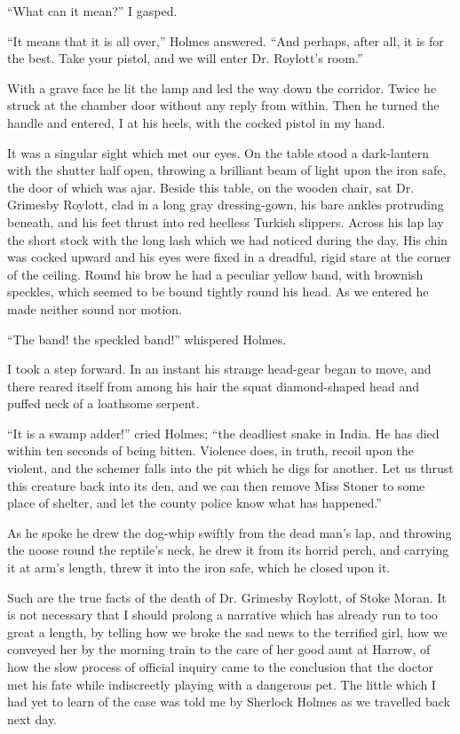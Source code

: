 “What can it mean?” I gasped.

“It means that it is all over,” Holmes answered. “And
perhaps, after all, it is for the best. Take your pistol, and we
will enter Dr. Roylott’s room.”

With a grave face he lit the lamp and led the way down
the corridor. Twice he struck at the chamber door without
any reply from within. Then he turned the handle and entered,
I at his heels, with the cocked pistol in my hand.

It was a singular sight which met our eyes. On the table
stood a dark-lantern with the shutter half open, throwing a
brilliant beam of light upon the iron safe, the door of which
was ajar. Beside this table, on the wooden chair, sat Dr.
Grimesby Roylott, clad in a long gray dressing-gown, his bare
ankles protruding beneath, and his feet thrust into red heelless
Turkish slippers. Across his lap lay the short stock with
the long lash which we had noticed during the day. His chin
was cocked upward and his eyes were fixed in a dreadful,
rigid stare at the corner of the ceiling. Round his brow he
had a peculiar yellow band, with brownish speckles, which
seemed to be bound tightly round his head. As we entered
he made neither sound nor motion.

“The band! the speckled band!” whispered Holmes.

I took a step forward. In an instant his strange head-gear
began to move, and there reared itself from among his hair
the squat diamond-shaped head and puffed neck of a loathsome
serpent.

“It is a swamp adder!” cried Holmes; “the deadliest
snake in India. He has died within ten seconds of being
bitten. Violence does, in truth, recoil upon the violent, and
the schemer falls into the pit which he digs for another. Let
us thrust this creature back into its den, and we can then remove
Miss Stoner to some place of shelter, and let the county
police know what has happened.”

As he spoke he drew the dog-whip swiftly from the dead
man’s lap, and throwing the noose round the reptile’s neck, he
drew it from its horrid perch, and carrying it at arm’s length,
threw it into the iron safe, which he closed upon it.

\strut

Such are the true facts of the death of Dr. Grimesby Roylott,
of Stoke Moran. It is not necessary that I should prolong
a narrative which has already run to too great a length,
by telling how we broke the sad news to the terrified girl, how
we conveyed her by the morning train to the care of her good
aunt at Harrow, of how the slow process of official inquiry
came to the conclusion that the doctor met his fate while
indiscreetly playing with a dangerous pet. The little which I
had yet to learn of the case was told me by Sherlock Holmes
as we travelled back next day.

